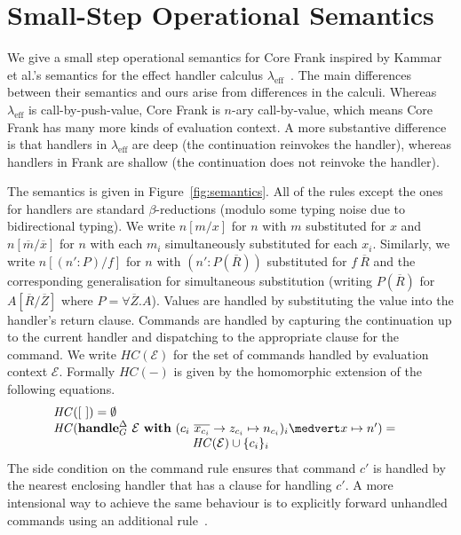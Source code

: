 \documentclass{sigplanconf}
\makeatletter
\newcommand{\lameff}{$\lambda_{\text{eff}}$\xspace}
\newcommand{\lameffrow}{$\lambda_{\text{eff}}^\rho$\xspace}
\newcommand{\EC}{\mathcal{E}}
\newcommand{\many}{\overline}
\newcommand\ba{\begin{array}}
\newcommand\ea{\end{array}}
\newcommand{\bl}{\ba[t]{@{}l@{}}}
\newcommand{\el}{\ea}
\newcommand{\key}[1]{\mathbf{#1}} %
\newcommand{\var}{\mathit}        %
\newcommand{\handleSymbol}{\rightarrow}
\newcommand{\handle}[2]{{#1} \handleSymbol {#2}}
\newcommand{\adj}{\Delta}
\makeatother
\begin{document}
\section{Small-Step Operational Semantics}
\label{sec:semantics}

We give a small step operational semantics for Core Frank inspired by
Kammar et al.'s semantics for the effect handler calculus
\lameff~\cite{KammarLO13}.
%
The main differences between their semantics and ours arise from
differences in the calculi. Whereas \lameff is call-by-push-value,
Core Frank is $n$-ary call-by-value, which means Core Frank has many
more kinds of evaluation context.
%
A more substantive difference is that handlers in \lameff are deep
(the continuation reinvokes the handler), whereas handlers in Frank
are shallow (the continuation does not reinvoke the handler).
%

The semantics is given in Figure~\ref{fig:semantics}.  All of the
rules except the ones for handlers are standard $\beta$-reductions
(modulo some typing noise due to bidirectional typing).
%
We write $n[m / x]$ for $n$ with $m$ substituted for $x$ and
$n[\many{m} / \many{x}]$ for $n$ with each $m_i$ simultaneously
substituted for each $x_i$.
%
Similarly, we write $n[(n' : P)/f]$ for $n$ with $(n' : P(\many{R}))$
substituted for $f~\many{R}$ and the corresponding generalisation for
simultaneous substitution (writing $P(\many{R})$ for
$A[\many{R}/\many{Z}]$ where $P = \forall \many{Z}.A$).
%
Values are handled by substituting the value into the handler's return
clause. Commands are handled by capturing the continuation up to the
current handler and dispatching to the appropriate clause for the
command. We write $\var{HC}(\EC)$ for the set of commands handled by
evaluation context $\EC$. Formally $\var{HC}(-)$ is given by the
homomorphic extension of the following equations.
%
\[
\bl
\var{HC}([~]) = \emptyset \\
\var{HC}(\key{handle}^\adj_G~ \EC ~\key{with}~
            (\handle{c_i~\many{x_{c_i}}}{z_{c_i}} \mapsto n_{c_i})_i \medvert
            x \mapsto n') =\quad \\
\hfill \var{HC}(\EC) \cup \{c_i\}_i \\
\el
\]
%
The side condition on the command rule ensures that command $c'$ is
handled by the nearest enclosing handler that has a clause for
handling $c'$.
%
A more intensional way to achieve the same behaviour is to explicitly
forward unhandled commands using an additional rule~\cite{KammarLO13}.
\end{document}
